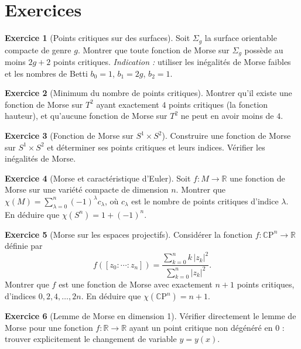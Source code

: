 \documentclass[12pt,a4paper,openany]{book}
\theoremstyle{definition}
\newtheorem{exercice}{Exercice}[chapter]
\theoremstyle{plain}
\theoremstyle{remark}
\newcommand{\R}{\mathbb{R}}
\newcommand{\CP}{\mathbb{C}\mathrm{P}}
\newcommand{\abs}[1]{\left|#1\right|}
\begin{document}
\section{Exercices}\label{sec:morse-exos}

\begin{exercice}[Points critiques sur des surfaces]\label{exo:morse-1}
Soit $\Sigma_g$ la surface orientable compacte de genre $g$. Montrer que toute
fonction de Morse sur $\Sigma_g$ possède au moins $2g + 2$ points critiques.
\emph{Indication :} utiliser les inégalités de Morse faibles et les nombres de
Betti $b_0 = 1$, $b_1 = 2g$, $b_2 = 1$.
\end{exercice}

\begin{exercice}[Minimum du nombre de points critiques]\label{exo:morse-2}
Montrer qu'il existe une fonction de Morse sur $T^2$ ayant exactement $4$ points
critiques (la fonction hauteur), et qu'aucune fonction de Morse sur $T^2$ ne
peut en avoir moins de $4$.
\end{exercice}

\begin{exercice}[Fonction de Morse sur $S^1 \times S^2$]\label{exo:morse-3}
Construire une fonction de Morse sur $S^1 \times S^2$ et déterminer ses points
critiques et leurs indices. Vérifier les inégalités de Morse.
\end{exercice}

\begin{exercice}[Morse et caractéristique d'Euler]\label{exo:morse-4}
Soit $f : M \to \R$ une fonction de Morse sur une variété compacte de dimension
$n$. Montrer que $\chi(M) = \sum_{\lambda=0}^n (-1)^\lambda c_\lambda$, où
$c_\lambda$ est le nombre de points critiques d'indice $\lambda$. En déduire que
$\chi(S^n) = 1 + (-1)^n$.
\end{exercice}

\begin{exercice}[Morse sur les espaces projectifs]\label{exo:morse-5}
Considérer la fonction $f : \CP^n \to \R$ définie par
\[
  f([z_0 : \cdots : z_n]) = \frac{\sum_{k=0}^n k \, \abs{z_k}^2}{\sum_{k=0}^n \abs{z_k}^2}.
\]
Montrer que $f$ est une fonction de Morse avec exactement $n+1$ points critiques,
d'indices $0, 2, 4, \ldots, 2n$. En déduire que $\chi(\CP^n) = n + 1$.
\end{exercice}

\begin{exercice}[Lemme de Morse en dimension 1]\label{exo:morse-6}
Vérifier directement le lemme de Morse pour une fonction
$f : \R \to \R$ ayant un point critique non dégénéré en $0$ : trouver
explicitement le changement de variable $y = y(x)$.
\end{exercice}
\end{document}
